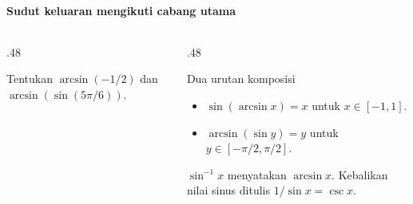 \documentclass{../../kalkulus-ppt}
\begin{document}
\begin{frame}{\insertsection}
    \framesubtitle{Sudut keluaran mengikuti cabang utama}
    \begin{columns}[t,onlytextwidth]
        \begin{column}{.48\textwidth}
            \begin{contoh}
                Tentukan $\arcsin(-1/2)$ dan $\arcsin(\sin(5\pi/6))$.
            \end{contoh}
        \end{column}
        \begin{column}{.48\textwidth}
            \begin{block}{Dua urutan komposisi}
                \begin{itemize}
                    \item $\sin(\arcsin x)=x$ untuk $x\in[-1,1]$.
                    \item $\arcsin(\sin y)=y$ untuk $y\in[-\pi/2,\pi/2]$.
                \end{itemize}
            \end{block}
            $\sin^{-1}x$ menyatakan $\arcsin x$. Kebalikan nilai sinus ditulis
            $1/\sin x=\csc x$.
        \end{column}
    \end{columns}
\end{frame}
\end{document}

